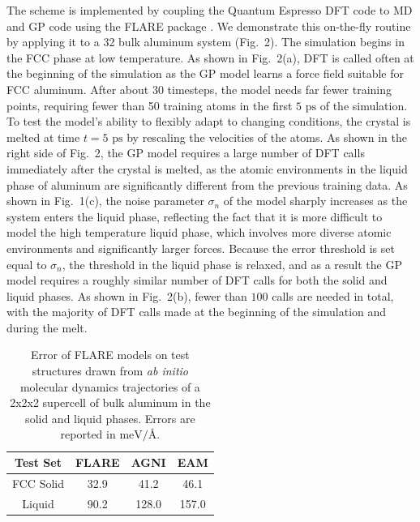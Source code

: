 \documentclass[%
reprint,
superscriptaddress,
amsmath,amssymb,
aps,
prl,
]{revtex4-1}
\begin{document}
The scheme is implemented by coupling the Quantum Espresso DFT code \cite{giannozzi2009quantum} to MD and GP code using the FLARE package \cite{flare}. We demonstrate this on-the-fly routine by applying it to a 32 bulk aluminum system (Fig.\ 2). The simulation begins in the FCC phase at low temperature. As shown in Fig.\ 2(a), DFT is called often at the beginning of the simulation as the GP model learns a force field suitable for FCC aluminum. After about 30 timesteps, the model needs far fewer training points, requiring fewer than 50 training atoms in the first $5 \text{ ps}$ of the simulation. To test the model's ability to flexibly adapt to changing conditions, the crystal is melted at time $t = 5 \text{ ps}$ by rescaling the velocities of the atoms. As shown in the right side of Fig.\ 2, the GP model requires a large number of DFT calls immediately after the crystal is melted, as the atomic environments in the liquid phase of aluminum are significantly different from the previous training data. As shown in Fig.\ 1(c), the noise parameter $\sigma_n$ of the model sharply increases as the system enters the liquid phase, reflecting the fact that it is more difficult to model the high temperature liquid phase, which involves more diverse atomic environments and significantly larger forces. Because the error threshold is set equal to $\sigma_n$, the threshold in the liquid phase is relaxed, and as a result the GP model requires a roughly similar number of DFT calls for both the solid and liquid phases. As shown in Fig.\ 2(b), fewer than $100$ calls are needed in total, with the majority of DFT calls made at the beginning of the simulation and during the melt.

\begin{table}
	\centering
	\begin{tabular}{c c c c} 
	 \hline
	 \hline
	 Test Set & FLARE & AGNI \cite{botu2016machine} &  EAM \cite{sheng2011highly} \\ 
	 \hline
	 FCC Solid & 32.9 & 41.2 & 46.1 \\ 
	 Liquid & 90.2 & 128.0 & 157.0 \\
	 \hline
	 \hline
	\end{tabular}
\caption{Error of FLARE models on test structures drawn from \textit{ab initio} molecular dynamics trajectories of a 2x2x2 supercell of bulk aluminum in the solid and liquid phases. Errors are reported in $\text{meV/\AA}$.}
\end{table}
\end{document}

